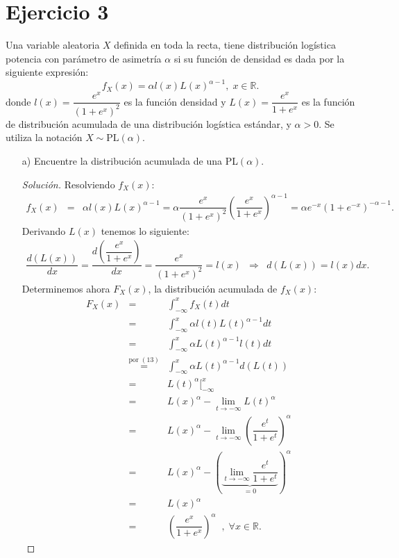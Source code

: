 \documentclass[11pt]{article}
\renewcommand{\=}[1]{\stackrel{#1}{=}} %
\newenvironment{sol}
{\begin{proof}[Solución]}
	{\end{proof}}
\theoremstyle{definition}
\theoremstyle{remark}
\begin{document}
\section*{Ejercicio 3}
Una variable aleatoria $X$ definida en toda la recta, tiene distribución logística potencia con parámetro de asimetría $\alpha$ si su función de densidad es dada por la siguiente expresión:
$$f_X(x)=\alpha l(x)L(x)^{\alpha-1},\;x\in\mathbb{R}.$$
donde $l(x)=\dfrac{e^x}{(1+e^x)^2}$ es la función densidad y $L(x)=\dfrac{e^x}{1+e^x}$ es la función de distribución acumulada de una distribución logística estándar, y $\alpha>0$. Se utiliza la notación $X\sim \text{PL}(\alpha)$.
\begin{itemize}
	\item[a)] Encuentre la distribución acumulada de una PL$(\alpha)$.
	\begin{sol}
		Resolviendo $f_X(x)$:
		\begin{eqnarray}
		f_X(x)&=&\alpha l(x)L(x)^{\alpha-1} = \alpha\dfrac{e^x}{(1+e^x)^2}\left(\dfrac{e^x}{1+e^x}\right)^{\alpha-1}=\alpha e^{-x}(1+e^{-x})^{-\alpha-1}.
		\end{eqnarray}
		Derivando $L(x)$ tenemos lo siguiente:
		\begin{eqnarray}
		\dfrac{d(L(x))}{dx}=\dfrac{d\left(\dfrac{e^x}{1+e^x}\right)}{dx}=\dfrac{e^x}{(1+e^x)^2}=l(x)&\Rightarrow&d(L(x))=l(x)dx.
		\end{eqnarray}
		Determinemos ahora $F_X(x)$, la distribución acumulada de $f_X(x)$:
		\begin{eqnarray}
		F_X(x)&=&\int_{-\infty}^{x}f_X(t)dt\nonumber\\
		&=&\int_{-\infty}^{x}\alpha l(t)L(t)^{\alpha-1}dt\nonumber\\
		&=&\int_{-\infty}^{x}\alpha L(t)^{\alpha-1}l(t)dt\nonumber\\
		&\stackrel{\mbox{por }(13)}{=}&\int_{-\infty}^{x}\alpha L(t)^{\alpha-1}d(L(t))\nonumber\\
		&=&L(t)^{\alpha}\big[^{x}_{-\infty}\nonumber\\
		&=&L(x)^{\alpha} -\lim\limits_{t\rightarrow -\infty}L(t)^{\alpha}\nonumber\\
		&=&L(x)^{\alpha} -\lim\limits_{t\rightarrow -\infty}\left(\dfrac{e^t}{1+e^t}\right)^{\alpha}\nonumber\\
		&=&L(x)^{\alpha} -\left(\underbrace{\lim\limits_{t\rightarrow -\infty}\dfrac{e^t}{1+e^t}}_{=0}\right)^{\alpha}\nonumber\\
		&=&L(x)^{\alpha}\nonumber\\
		&=&\left(\dfrac{e^x}{1+e^x}\right)^{\alpha}\;\;,\;\forall x\in\mathbb{R}.

\end{eqnarray}
\end{sol}
\end{itemize}
\end{document}
